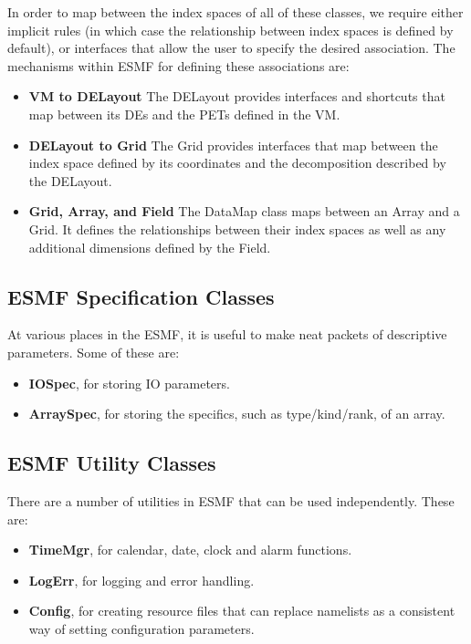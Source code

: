 In order to map between the index spaces of all of these classes,
we require either implicit rules (in which case the relationship 
between index spaces is defined by default), or interfaces that 
allow the user to specify the desired association.  The mechanisms
within ESMF for defining these associations are:

\begin{itemize}

\item {\bf VM to DELayout} The DELayout provides interfaces and 
shortcuts that map between its DEs and the PETs defined in the 
VM.

\item {\bf DELayout to Grid} The Grid provides interfaces that map 
between the index space defined by its coordinates and the decomposition 
described by the DELayout.

\item {\bf Grid, Array, and Field} The DataMap class maps between 
an Array and a Grid.  It defines the relationships between their
index spaces as well as any additional dimensions defined by the Field.

\end{itemize}

\subsection{ESMF Specification Classes}

At various places in the ESMF, it is useful to make neat packets
of descriptive parameters.  Some of these are:
\begin{itemize}
\item {\bf IOSpec}, for storing IO parameters.
\item {\bf ArraySpec}, for storing the specifics, such as type/kind/rank,
of an array.
\end{itemize}

\subsection{ESMF Utility Classes}

There are a number of utilities in ESMF that can be used independently.
These are:
\begin{itemize}
\item {\bf TimeMgr}, for calendar, date, clock and alarm functions.
\item {\bf LogErr}, for logging and error handling.
\item {\bf Config}, for creating resource files that can replace namelists
as a consistent way of setting configuration parameters.
\end{itemize}













